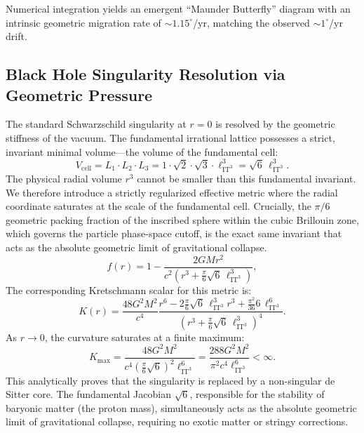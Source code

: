 \documentclass[onecolumn,aps,prd,superscriptaddress,nofootinbib,amsmath,amssymb]{revtex4-2}
\theoremstyle{definition}
\theoremstyle{remark}
\newcommand{\ITthree}{\ensuremath{\mathrm{IT}^3}}
\begin{document}
Numerical integration yields an emergent ``Maunder Butterfly'' diagram with an intrinsic geometric migration rate of $\sim 1.15^\circ$/yr, matching the observed $\sim 1^\circ$/yr drift.

\subsection{Black Hole Singularity Resolution via Geometric Pressure}

The standard Schwarzschild singularity at $r=0$ is resolved by the geometric stiffness of the vacuum. The fundamental irrational lattice possesses a strict, invariant minimal volume---the volume of the fundamental cell:
\begin{equation}
V_{\text{cell}} = L_1 \cdot L_2 \cdot L_3 = 1 \cdot \sqrt{2} \cdot \sqrt{3} \cdot \ell_{\ITthree}^3 = \sqrt{6} \, \ell_{\ITthree}^3.
\end{equation}
The physical radial volume $r^3$ cannot be smaller than this fundamental invariant. We therefore introduce a strictly regularized effective metric where the radial coordinate saturates at the scale of the fundamental cell. Crucially, the $\pi/6$ geometric packing fraction of the inscribed sphere within the cubic Brillouin zone, which governs the particle phase-space cutoff, is the exact same invariant that acts as the absolute geometric limit of gravitational collapse.
\begin{equation}
f(r) = 1 - \frac{2GMr^2}{c^2(r^3 + \frac{\pi}{6} \sqrt{6} \, \ell_{\ITthree}^3)},
\label{eq:regularized_metric_j6}
\end{equation}
The corresponding Kretschmann scalar for this metric is:
\begin{equation}
K(r) = \frac{48G^2M^2}{c^4} \frac{r^6 - 2\frac{\pi}{6}\sqrt{6} \, \ell_{\ITthree}^3 r^3 + \frac{\pi^2}{36} 6 \, \ell_{\ITthree}^6}{(r^3 + \frac{\pi}{6}\sqrt{6} \, \ell_{\ITthree}^3)^4}.
\label{eq:kretschmann_j6}
\end{equation}
As $r \to 0$, the curvature saturates at a finite maximum:
\begin{equation}
K_{\text{max}} = \frac{48G^2M^2}{c^4 (\frac{\pi}{6}\sqrt{6})^2 \ell_{\ITthree}^6} = \frac{288G^2M^2}{\pi^2 c^4 \ell_{\ITthree}^6} < \infty.
\label{eq:kmax_j6}
\end{equation}
This analytically proves that the singularity is replaced by a non-singular de Sitter core. The fundamental Jacobian $\sqrt{6}$, responsible for the stability of baryonic matter (the proton mass), simultaneously acts as the absolute geometric limit of gravitational collapse, requiring no exotic matter or stringy corrections.
\end{document}
